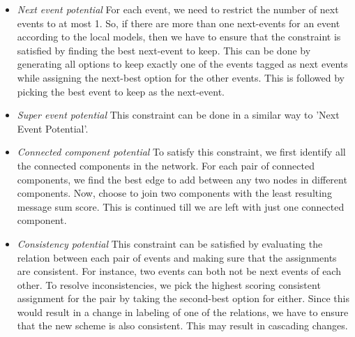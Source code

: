 \begin{itemize}
\item {\em Next event potential} For each event, we need to restrict the number of next events to at most 1. So, if there are more than one next-events for an event according to the local models, then we have to ensure that the constraint is satisfied by finding the best next-event to keep. This can be done by generating all options to keep exactly one of the events tagged as next events while assigning the next-best option for the other events. This is followed by picking the best event to keep as the next-event.
\item {\em Super event potential} This constraint can be done in a similar way to 'Next Event Potential'.
\item {\em Connected component potential} To satisfy this constraint, we first identify all the connected components in the network. For each pair of connected components, we find the best edge to add between any two nodes in different components. Now, choose to join two components with the least resulting message sum score. This is continued till we are left with just one connected component.
\item {\em Consistency potential} This constraint can be satisfied by evaluating the relation between each pair of events and making sure that the assignments are consistent. For instance, two events can both not be next events of each other. To resolve inconsistencies, we pick the highest scoring consistent assignment for the pair by taking the second-best option for either. Since this would result in a change in labeling of one of the relations, we have to ensure that the new scheme is also consistent. This may result in cascading changes.
\end{itemize}


